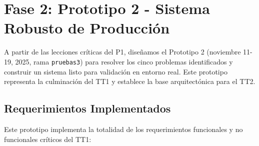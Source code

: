 \section{Fase 2: Prototipo 2 - Sistema Robusto de Producción}
\label{sec:prototipo2}

A partir de las lecciones críticas del P1, diseñamos el Prototipo 2 (noviembre 11-19, 2025, rama \texttt{pruebas3}) para resolver los cinco problemas identificados y construir un sistema listo para validación en entorno real. Este prototipo representa la culminación del TT1 y establece la base arquitectónica para el TT2.

\subsection{Requerimientos Implementados}
\label{subsec:p2_requerimientos}

Este prototipo implementa la totalidad de los requerimientos funcionales y no funcionales críticos del TT1:


